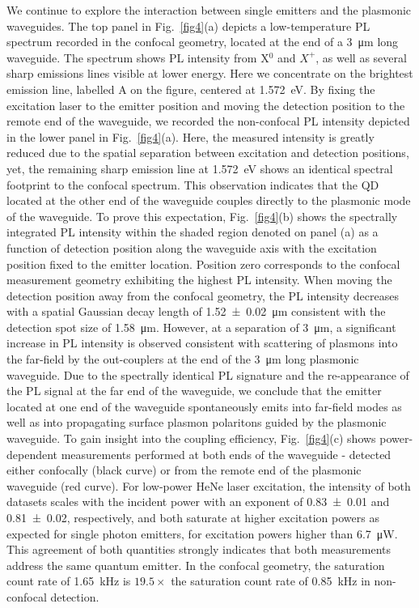 \documentclass[journal=nalefd,manuscript=letter]{achemso}
\begin{document}
We continue to explore the interaction between single emitters and the plasmonic waveguides.
The top panel in Fig.~\ref{fig4}(a) depicts a low-temperature PL spectrum recorded in the confocal geometry, located at the end of a \SI{3}{\micro\meter} long waveguide.
The spectrum shows PL intensity from X$^0$ and $X^+$, as well as several sharp emissions lines visible at lower energy.
Here we concentrate on the brightest emission line, labelled A on the figure, centered at \SI{1.572}{\electronvolt}.  By fixing the excitation laser to the emitter position and moving the detection position to the remote end of the waveguide, we recorded the non-confocal PL intensity depicted in the lower panel in Fig.~\ref{fig4}(a).  Here, the measured intensity is greatly reduced due to the spatial separation between excitation and detection positions, yet, the remaining sharp emission line at \SI{1.572}{\electronvolt} shows an identical spectral footprint to the confocal spectrum.  This observation indicates that the QD located at the other end of the waveguide couples directly to the plasmonic mode of the waveguide.  To prove this expectation, Fig.~\ref{fig4}(b) shows the spectrally integrated PL intensity within the shaded region denoted on panel (a) as a function of detection position along the waveguide axis with the excitation position fixed to the emitter location.
Position zero corresponds to the confocal measurement geometry exhibiting the highest PL intensity.
When moving the detection position away from the confocal geometry, the PL intensity decreases with a spatial Gaussian decay length of \SI{1.52 \pm 0.02}{\micro\meter} consistent with the detection spot size of \SI{1.58}{\micro\meter}.  However, at a separation of \SI{3}{\micro\meter}, a significant increase in PL intensity is observed consistent with scattering of plasmons into the far-field by the out-couplers at the end of the \SI{3}{\micro\meter} long plasmonic waveguide.
Due to the spectrally identical PL signature and the re-appearance of the PL signal at the far end of the waveguide, we conclude that the emitter located at one end of the waveguide spontaneously emits into far-field modes as well as into propagating surface plasmon polaritons guided by the plasmonic waveguide.
To gain insight into the coupling efficiency, Fig.~\ref{fig4}(c) shows power-dependent measurements performed at both ends of the waveguide - detected either confocally (black curve) or from the remote end of the plasmonic waveguide (red curve).
For low-power HeNe laser excitation, the intensity of both datasets scales with the incident power with an exponent of \SI{0.83 \pm 0.01}{} and \SI{0.81 \pm 0.02}{}, respectively, and both saturate at higher excitation powers as expected for single photon emitters, for excitation powers higher than \SI{6.7}{\micro\watt}.
This agreement of both quantities strongly indicates that both measurements address the same quantum emitter.
In the confocal geometry, the saturation count rate of \SI{1.65}{\kilo\hertz} is $19.5 \times$ the saturation count rate of \SI{0.85}{\kilo\hertz} in non-confocal detection.
\end{document}
